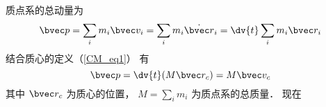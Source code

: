 

质点系的总动量为
\begin{equation}
\bvec p = \sum_i m_i \bvec v_i = \sum_i m_i \dot{\bvec r}_i = \dv{t}  \sum_i m_i \bvec r_i
\end{equation}
结合质心的定义（\autoref{CM_eq1}） 有
\begin{equation}
\bvec p = \dv{t} (M \bvec r_c) = M\bvec v_c
\end{equation}
其中 $\bvec r_c$ 为质心的位置， $M = \sum_i m_i$ 为质点系的总质量． 现在
